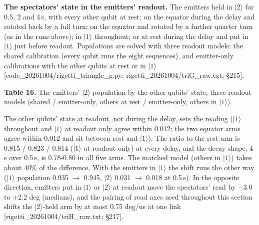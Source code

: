 \documentclass[11pt]{article}
\begin{document}
\textbf{The spectators' state in the emitters' readout.} The emitters held in \(|2\rangle\) for 0.5, 2 and 4\,\textmu s, with every other qubit at rest; on the equator during the delay and rotated back by a full turn; on the equator and rotated by a further quarter turn (as in the runs above); in \(|1\rangle\) throughout; or at rest during the delay and put in \(|1\rangle\) just before readout. Populations are solved with three readout models: the shared calibration (every qubit runs the eight sequences), and emitter-only calibrations with the other qubits at rest or in \(|1\rangle\) {[}code\_20261004/rigetti\_triangle\_g.py; rigetti\_20261004/triG\_raw.txt; \S{}215{]}.

\textbf{Table 16.} The emitters' \(|2\rangle\) population by the other qubits' state; three readout models (shared / emitter-only, others at rest / emitter-only, others in \(|1\rangle\)).

\par\smallskip\noindent{}\par\smallskip
The other qubits' state at readout, not during the delay, sets the reading (\(|1\rangle\) throughout and \(|1\rangle\) at readout only agree within 0.012; the two equator arms agree within 0.012 and sit between rest and \(|1\rangle\)). The ratio to the rest arm is 0.815 / 0.823 / 0.814 (\(|1\rangle\) at readout only) at every delay, and the decay shape, 4\,\textmu s over 0.5\,\textmu s, is 0.78-0.80 in all five arms. The matched model (others in \(|1\rangle\)) takes about 40\% of the difference. With the emitters in \(|1\rangle\) the shift runs the other way (\(|1\rangle\) population 0.935 \(\to\) 0.945, \(|2\rangle\) 0.031 \(\to\) 0.018 at 0.5\,\textmu s). In the opposite direction, emitters put in \(|1\rangle\) or \(|2\rangle\) at readout move the spectators' read by \(-\)3.0 to +2.2 deg (medians), and the pairing of read axes used throughout this section shifts the \(|2\rangle\)-held arm by at most 0.75 deg/us at one link {[}rigetti\_20261004/triH\_raw.txt; \S{}217{]}.
\end{document}
